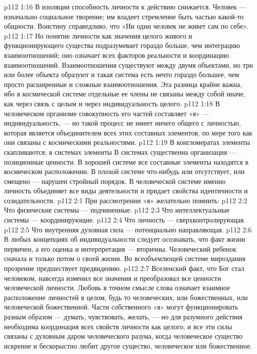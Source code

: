 \vs p112 1:16 В изоляции способность личности к действию снижается. Человек --- изначально социальное творение; им владеет стремление быть частью какой\hyp{}то общности. Воистину справедливо, что «Ни один человек не живет сам по себе».
\vs p112 1:17 Но понятие личности как значения целого живого и функционирующего существа подразумевает гораздо больше, чем интеграцию взаимоотношений; оно означает  всех факторов реальности и координацию взаимоотношений. Взаимоотношения существуют между двумя объектами, но три или более объекта образуют  и такая система есть нечто гораздо большее, чем просто расширенные и сложные взаимоотношения. Эта разница крайне важна, ибо в космической системе отдельные ее члены не связаны между собой иначе, как через связь с целым и через индивидуальность целого.
\vs p112 1:18 В человеческом организме совокупность его частей составляет «я» --- индивидуальность, --- но такой процесс не имеет ничего общего с личностью, которая является объединителем всех этих составных элементов, по мере того как они связаны с космическими реальностями.
\vs p112 1:19 В конгломератах элементы скапливаются; в системах элементы  В системах существенна организация --- позиционные ценности. В хорошей системе все составные элементы находятся в космическом расположении. В плохой системе что\hyp{}нибудь или отсутствует, или смещено --- нарушен стройный порядок. В человеческой системе именно личность объединяет все виды деятельности и придает свойства идентичности и созидательности.
\vs p112 2:1 При рассмотрении «я» желательно помнить:
\vs p112 2:2 \bibnobreakspace Что физические системы --- подчиненные.
\vs p112 2:3 \bibnobreakspace Что интеллектуальные системы --- координирующие.
\vs p112 2:4 \bibnobreakspace Что личность --- сверхконтролирующая.
\vs p112 2:5 \bibnobreakspace Что внутренняя духовная сила --- потенциально направляющая.
\vs p112 2:6 \pc В любых концепциях об индивидуальности следует осознавать, что факт жизни первичен, а его оценка и интерпретация --- вторичны. Человеческий ребенок сначала  и только потом  о своей жизни. Во всеобъемлющей системе мироздания прозрение предшествует предвидению.
\vs p112 2:7 \pc Вселенский факт, что Бог стал человеком, навсегда изменил все значения и преобразовал все ценности человеческой личности. Любовь в точном смысле слова означает взаимное расположение личностей в целом, будь то человеческих, или божественных, или человеческой  божественной. Части собственного «я» могут функционировать разным образом --- думать, чувствовать, желать, --- но для разумного действия необходима координация всех свойств личности как целого; и все эти силы связаны с духовным даром человеческого разума, когда человеческое существо искренне и бескорыстно любит другое существо, человеческое или божественное.
